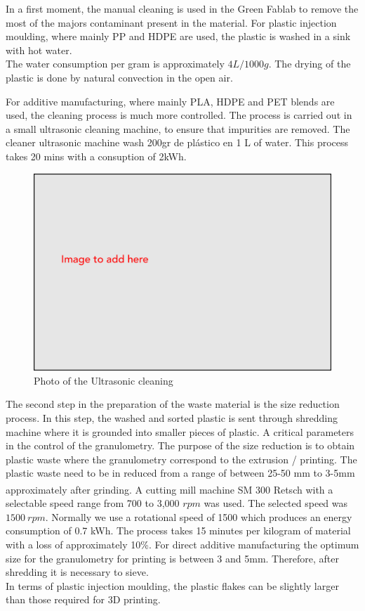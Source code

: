 \documentclass[
  11pt,
]{article}
\begin{document}
In a first moment, the manual cleaning is used in the Green Fablab to
remove the most of the majors contaminant present in the material. For
plastic injection moulding, where mainly PP and HDPE are used, the
plastic is washed in a sink with hot water.\\
The water consumption per gram is approximately \(4L/1000g\). The drying
of the plastic is done by natural convection in the open air.

For additive manufacturing, where mainly PLA, HDPE and PET blends are
used, the cleaning process is much more controlled. The process is
carried out in a small ultrasonic cleaning machine, to ensure that
impurities are removed. The cleaner ultrasonic machine wash 200gr de
plástico en 1 L of water. This process takes 20 mins with a consuption
of 2kWh.

\begin{figure}[H]

{\centering \includegraphics[width=5.20833in,height=\textheight]{figures/Image-to-add.png}

}

\caption{Photo of the Ultrasonic cleaning}

\end{figure}

The second step in the preparation of the waste material is the size
reduction process. In this step, the washed and sorted plastic is sent
through shredding machine where it is grounded into smaller pieces of
plastic. A critical parameters in the control of the granulometry. The
purpose of the size reduction is to obtain plastic waste where the
granulometry correspond to the extrusion / printing. The plastic waste
need to be in reduced from a range of between 25-50 mm to 3-5mm
approximately after grinding. A cutting mill machine SM 300
Retsch\textsuperscript{\textregistered} with a selectable speed range
from 700 to 3,000 \(rpm\) was used. The selected speed was \(1500~rpm\).
Normally we use a rotational speed of 1500 which produces an energy
consumption of 0.7 kWh. The process takes 15 minutes per kilogram of
material with a loss of approximately 10\%. For direct additive
manufacturing the optimum size for the granulometry for printing is
between 3 and 5mm. Therefore, after shredding it is necessary to
sieve.\\
In terms of plastic injection moulding, the plastic flakes can be
slightly larger than those required for 3D printing.
\end{document}
